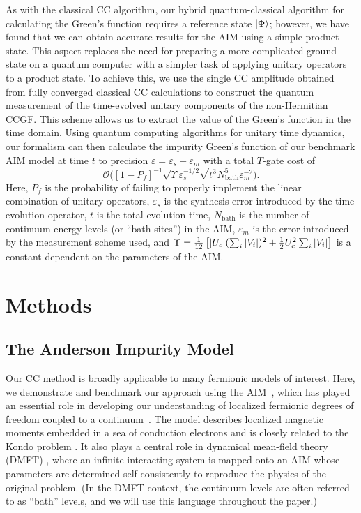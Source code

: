 \documentclass[aip,reprint,table,xcdraw,usenames,dvipsnames]{revtex4-1}
\begin{document}
As with the classical CC algorithm, our hybrid quantum-classical algorithm 
for calculating the Green’s function requires a reference state $\ket{\Phi}$; however, we have found that we can obtain accurate results for the AIM using 
a simple product state. This aspect replaces the need for preparing a more complicated ground state on a quantum computer with a simpler task of applying unitary operators to a product state. To achieve this, we use the single CC amplitude obtained from fully converged classical CC calculations to construct the quantum measurement of the time-evolved unitary components of the non-Hermitian CCGF. This scheme allows us to extract the value of the Green’s function in the time domain. Using quantum computing algorithms for unitary time dynamics, our formalism can then calculate the impurity Green's function of our benchmark AIM model at time $t$ to precision $\varepsilon = \varepsilon_s + \varepsilon_m$
with a total $T$-gate cost of 
\begin{equation*}
\mathcal{O} \big([1-P_f]^{-1} \sqrt{\Upsilon} \varepsilon_s^{-1/2} \sqrt{t^3} N_\mathrm{bath}^5 \varepsilon_m^{-2}\big). 
\end{equation*}
Here, $P_f$ is the probability of failing to properly implement the linear combination of unitary operators, $\varepsilon_s$ is the synthesis error introduced by the time evolution operator, $t$ is the total evolution time, $N_{\text{bath}}$ is the number of continuum energy levels (or ``bath sites'') in the AIM, $\varepsilon_m$ is the error introduced by the measurement scheme used, and $\Upsilon = \frac{1}{12} \left[ \abs{ U_c} (\sum_i \abs{V_i})^2 + \frac{1}{2} U_c^2 \sum_i \abs{V_i} \right]$ is a constant dependent on the parameters of the AIM. 

\section{Methods} \label{sec:methods}

\subsection*{The Anderson Impurity Model} \label{sec:AIM}
Our CC method is broadly applicable to many fermionic models of interest. Here, we demonstrate and benchmark our approach using the AIM~\cite{Anderson1961}, which has played an essential role in developing our understanding of localized fermionic degrees of freedom coupled to a continuum~\cite{AIMReview, Mahan1990}. The model describes localized magnetic moments embedded in a sea of conduction electrons and is closely related to the Kondo problem \cite{Schrieffer1966, AIMReview}. It also plays a central role in dynamical mean-field theory (DMFT) \cite{Georges1996}, where an infinite interacting system is mapped onto an AIM whose parameters are determined self-consistently to reproduce the physics of the original problem. (In the DMFT context, the continuum levels are often referred to as ``bath'' levels, and we will use this language throughout the paper.)
\end{document}
